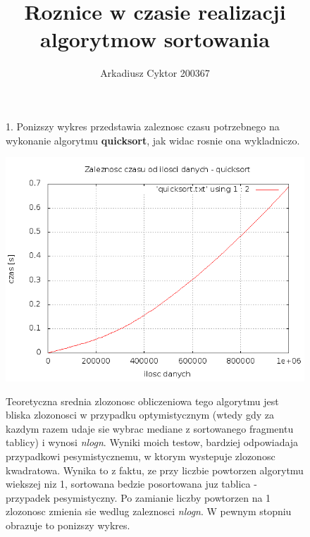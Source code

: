 \documentclass[a4paper,11pt]{report}
\title{Roznice w czasie realizacji algorytmow sortowania}
\author{Arkadiusz Cyktor 200367}
\begin{document}
\maketitle

\begin{figure}
  1. Ponizszy wykres przedstawia zaleznosc czasu potrzebnego na wykonanie algorytmu \textbf{quicksort}, jak widac rosnie ona wykladniczo.
   \begin{center} \includegraphics[scale=0.55]{./quicksort.png}\end{center}
   Teoretyczna srednia zlozonosc obliczeniowa tego algorytmu jest bliska zlozonosci w przypadku optymistycznym (wtedy gdy za kazdym razem udaje sie wybrac mediane z sortowanego fragmentu tablicy) i wynosi \emph{nlogn}. Wyniki moich testow, bardziej odpowiadaja przypadkowi pesymistycznemu, w ktorym wystepuje zlozonosc kwadratowa. Wynika to z faktu, ze przy liczbie powtorzen algorytmu wiekszej niz 1, sortowana bedzie posortowana juz tablica - przypadek pesymistyczny.
   Po zamianie liczby powtorzen na 1 zlozonosc zmienia sie wedlug zaleznosci \emph{nlogn}. W pewnym stopniu obrazuje to ponizszy wykres.
   \end{figure}
\end{document}
